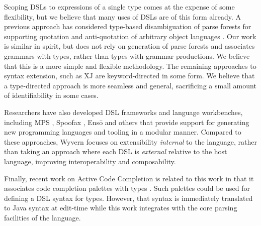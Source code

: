 Scoping DSLs to expressions of a single type comes at the expense of some flexibility, but we believe that many uses of DSLs are of this form already. A previous approach has considered type-based disambiguation of parse forests for supporting quotation and anti-quotation of arbitrary object languages \cite{bravenboer2005generalized}. Our work is similar in spirit, but does not rely on generation of parse forests and associates grammars with types, rather than types with grammar productions. We believe that this is a more simple and flexible methodology. The remaining approaches to syntax extension, such as XJ \cite{DBLP:conf/scam/ClarkSW08} are keyword-directed in some form. We believe that a type-directed approach is more seamless and general, sacrificing a small amount of identifiability in some cases.

Researchers have also developed DSL frameworks and language workbenches, including MPS \cite{mps}, Spoofax \cite{KatsVisser2010}, Ens\={o} \cite{enso} and others \cite{krahn2008monticore,van1992pregmatic} that provide support for generating new programming languages and tooling in a modular manner.  
Compared to these approaches, Wyvern focuses on extensibility \emph{internal} to the language, rather than taking an approach where each DSL is \emph{external} relative to the host language, improving interoperability and composability.

Finally, recent work on Active Code Completion is related to this work in that it associates code completion palettes with types \cite{omar2012active}. Such palettes could be used for defining a DSL syntax for types. However, that syntax is  immediately translated to Java syntax at edit-time while this work integrates with the core parsing facilities of the language.




